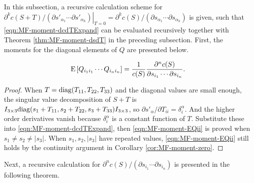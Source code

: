 In this subsection, a recursive calculation scheme for $\left. \partial^k c(S+T)/ (\partial s'_{\alpha_1} \cdots \partial s'_{\alpha_k}) \right|_{T=0} = \partial^k c(S) / (\partial s_{\alpha_1} \cdots \partial s_{\alpha_k})$ is given, such that \eqref{eqn:MF-moment-dcdTExpand} can be evaluated recursively together with Theorem \ref{thm:MF-moment-dsdT} in the preceding subsection.
First, the moments for the diagonal elements of $Q$ are presented below.
\begin{lemma} \label{lemma:MF-moment-EQii}
	\begin{equation} \label{eqn:MF-moment-EQii}
		\mathrm{E}\left[ Q_{i_1i_1} \cdots Q_{i_ni_n} \right] = \frac{1}{c(S)} \frac{\partial^n c(S)}{\partial s_{i_1} \cdots \partial s_{i_n}}.
	\end{equation}
\end{lemma}
\begin{proof}
	When $T = \mathrm{diag}(T_{11},T_{22},T_{33})$ and the diagonal values are small enough, the singular value decomposition of $S+T$ is $I_{3\times 3} \mathrm{diag}(s_1+T_{11}, s_2+T_{22}, s_3+T_{33}) I_{3\times 3}$, so $\partial s'_\alpha / \partial T_{ii} = \delta_i^\alpha$.
	And the higher order derivatives vanish because $\delta_i^\alpha$ is a constant function of $T$.
	Substitute these into \eqref{eqn:MF-moment-dcdTExpand}, then \eqref{eqn:MF-moment-EQii} is proved when $s_1 \neq s_2 \neq |s_3|$.
	When $s_1, s_2, |s_3|$ have repeated values, \eqref{eqn:MF-moment-EQii} still holds by the continuity argument in Corollary \ref{cor:MF-moment-zero}.
\end{proof}

Next, a recursive calculation for $\partial^n c(S) / (\partial s_{i_1} \cdots \partial s_{i_n})$ is presented in the following theorem.

